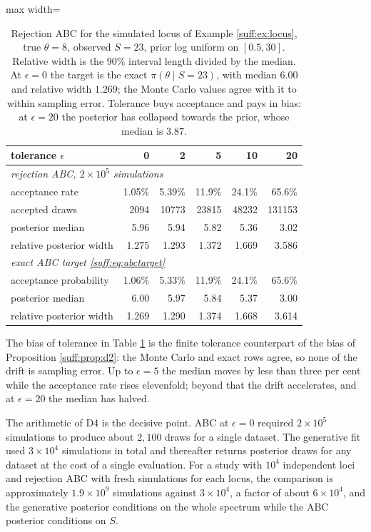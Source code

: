 \begin{table}[t]
\centering
\begin{adjustbox}{max width=\textwidth}
\begin{tabular}{lrrrrr}
\toprule
tolerance $\epsilon$ & 0 & 2 & 5 & 10 & 20 \\
\midrule
\multicolumn{6}{l}{\emph{rejection ABC, $2\times10^5$ simulations}} \\
acceptance rate           & 1.05\% & 5.39\% & 11.9\% & 24.1\% & 65.6\% \\
accepted draws            & 2094 & 10773 & 23815 & 48232 & 131153 \\
posterior median          & 5.96 & 5.94 & 5.82 & 5.36 & 3.02 \\
relative posterior width  & 1.275 & 1.293 & 1.372 & 1.669 & 3.586 \\
\midrule
\multicolumn{6}{l}{\emph{exact ABC target \eqref{suff:eq:abctarget}}} \\
acceptance probability    & 1.06\% & 5.33\% & 11.9\% & 24.1\% & 65.6\% \\
posterior median          & 6.00 & 5.97 & 5.84 & 5.37 & 3.00 \\
relative posterior width  & 1.269 & 1.290 & 1.374 & 1.668 & 3.614 \\
\bottomrule
\end{tabular}
\end{adjustbox}
\caption{Rejection ABC for the simulated locus of Example \ref{suff:ex:locus}, true
$\theta=8$, observed $S=23$, prior log uniform on $[0.5,30]$. Relative width is the $90\%$
interval length divided by the median. At $\epsilon=0$ the target is the exact
$\pi(\theta\mid S=23)$, with median $6.00$ and relative width $1.269$; the Monte Carlo values
agree with it to within sampling error. Tolerance buys acceptance and pays in bias: at
$\epsilon=20$ the posterior has collapsed towards the prior, whose median is $3.87$.}
\label{suff:tab:abc}
\end{table}

The bias of tolerance in Table \ref{suff:tab:abc} is the finite tolerance counterpart of the bias of Proposition
\ref{suff:prop:d2}: the Monte Carlo and exact rows agree, so none of the drift is sampling
error. Up to $\epsilon=5$ the median moves by less than three per cent while the acceptance
rate rises elevenfold; beyond that the drift accelerates, and at $\epsilon=20$ the median has
halved.

The arithmetic of D4 is the decisive point. ABC at $\epsilon=0$ required $2\times10^5$
simulations to produce about $2{,}100$ draws for a single dataset. The generative fit used
$3\times10^4$ simulations in total and thereafter returns posterior draws for any dataset at
the cost of a single evaluation. For a study with $10^4$ independent loci and rejection ABC with fresh simulations for each locus, the comparison is
approximately $1.9\times10^9$ simulations against $3\times10^4$, a factor of about
$6\times10^4$, and the generative posterior conditions on the whole spectrum while the ABC
posterior conditions on $S$.

